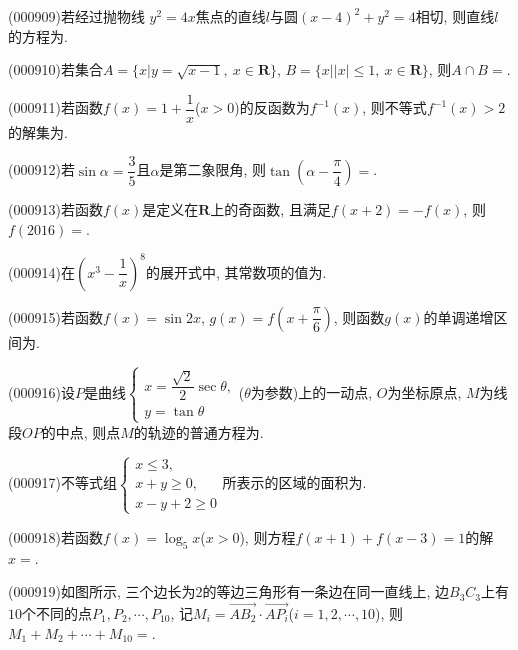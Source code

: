 \begin{center}
\end{center}
\item (000909)若经过抛物线 $y^2=4x$焦点的直线$l$与圆$(x-4)^2+y^2=4$相切, 则直线$l$的方程为.
\item (000910)若集合$A=\{x|y=\sqrt{x-1},\ x\in \mathbf{R}\}$, $B=\{x||x|\le 1,\ x\in \mathbf{R}\}$, 则$A\cap B=$.
\item (000911)若函数$f(x)=1+\dfrac1x$($x>0$)的反函数为$f^{-1}(x)$, 则不等式$f^{-1}(x)>2$的解集为.
\item (000912)若$\sin \alpha =\dfrac35$且$\alpha$是第二象限角, 则$\tan(\alpha -\dfrac\pi 4)=$.
\item (000913)若函数$f(x)$是定义在$\mathbf{R}$上的奇函数, 且满足$f(x+2)=-f(x)$, 则$f(2016)=$.
\item (000914)在$(x^3-\dfrac1x)^8$的展开式中, 其常数项的值为.
\item (000915)若函数$f(x)=\sin 2x$, $g(x)=f(x+\dfrac\pi 6)$, 则函数$g(x)$的单调递增区间为.
\item (000916)设$P$是曲线$\begin{cases} x=\dfrac{\sqrt2}2\sec \theta, \\ y=\tan \theta \end{cases}$($\theta $为参数)上的一动点, $O$为坐标原点, $M$为线段$OP$的中点, 则点$M$的轨迹的普通方程为.
\item (000917)不等式组$\begin{cases} x\le 3, \\ x+y\ge 0, \\ x-y+2 \ge 0 \end{cases}$所表示的区域的面积为.
\item (000918)若函数$f(x)=\log _5 x$($x>0$), 则方程$f(x+1)+f(x-3)=1$的解$x=$.
\item (000919)如图所示, 三个边长为$2$的等边三角形有一条边在同一直线上, 边$B_3C_3$上有$10$个不同的点$P_1,P_2,\cdots,P_{10}$, 记$M_i=\overrightarrow{AB_2}\cdot \overrightarrow{AP_i}$($i=1,2,\cdots,10$), 则$M_1+M_2+\cdots+M_{10}=$.
